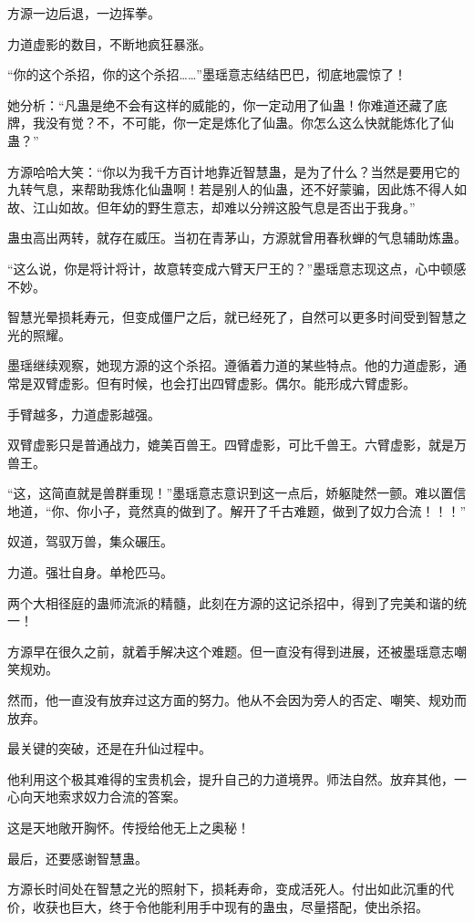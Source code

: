 \begin{this_body}
方源一边后退，一边挥拳。

力道虚影的数目，不断地疯狂暴涨。

“你的这个杀招，你的这个杀招……”墨瑶意志结结巴巴，彻底地震惊了！

她分析：“凡蛊是绝不会有这样的威能的，你一定动用了仙蛊！你难道还藏了底牌，我没有觉？不，不可能，你一定是炼化了仙蛊。你怎么这么快就能炼化了仙蛊？”

方源哈哈大笑：“你以为我千方百计地靠近智慧蛊，是为了什么？当然是要用它的九转气息，来帮助我炼化仙蛊啊！若是别人的仙蛊，还不好蒙骗，因此炼不得人如故、江山如故。但年幼的野生意志，却难以分辨这股气息是否出于我身。”

蛊虫高出两转，就存在威压。当初在青茅山，方源就曾用春秋蝉的气息辅助炼蛊。

“这么说，你是将计将计，故意转变成六臂天尸王的？”墨瑶意志现这点，心中顿感不妙。

智慧光晕损耗寿元，但变成僵尸之后，就已经死了，自然可以更多时间受到智慧之光的照耀。

墨瑶继续观察，她现方源的这个杀招。遵循着力道的某些特点。他的力道虚影，通常是双臂虚影。但有时候，也会打出四臂虚影。偶尔。能形成六臂虚影。

手臂越多，力道虚影越强。

双臂虚影只是普通战力，媲美百兽王。四臂虚影，可比千兽王。六臂虚影，就是万兽王。

“这，这简直就是兽群重现！”墨瑶意志意识到这一点后，娇躯陡然一颤。难以置信地道，“你、你小子，竟然真的做到了。解开了千古难题，做到了奴力合流！！！”

奴道，驾驭万兽，集众碾压。

力道。强壮自身。单枪匹马。

两个大相径庭的蛊师流派的精髓，此刻在方源的这记杀招中，得到了完美和谐的统一！

方源早在很久之前，就着手解决这个难题。但一直没有得到进展，还被墨瑶意志嘲笑规劝。

然而，他一直没有放弃过这方面的努力。他从不会因为旁人的否定、嘲笑、规劝而放弃。

最关键的突破，还是在升仙过程中。

他利用这个极其难得的宝贵机会，提升自己的力道境界。师法自然。放弃其他，一心向天地索求奴力合流的答案。

这是天地敞开胸怀。传授给他无上之奥秘！

最后，还要感谢智慧蛊。

方源长时间处在智慧之光的照射下，损耗寿命，变成活死人。付出如此沉重的代价，收获也巨大，终于令他能利用手中现有的蛊虫，尽量搭配，使出杀招。


\end{this_body}
